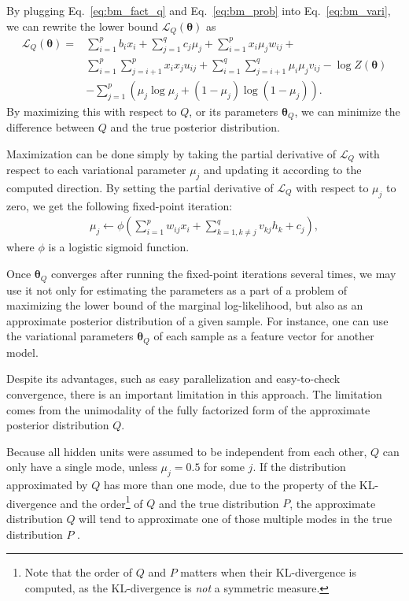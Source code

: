 \documentclass[dissertation,nocontribution,draft*]{aaltoseries}
\newcommand{\vects}[1]{\boldsymbol{#1}}
\newcommand{\TT}[0]{{\vects{\theta}}}
\newcommand{\LL}[0]{\mathcal{L}}
\begin{document}
By plugging Eq.~\eqref{eq:bm_fact_q} and
Eq.~\eqref{eq:bm_prob} into Eq.~\eqref{eq:bm_vari}, we can
rewrite the lower bound $\LL_Q(\TT)$ as
\begin{align}
    \label{eq:bm_lowerbound}
    \LL_Q(\TT) =& \sum_{i=1}^p b_i x_i + \sum_{j=1}^q c_j
    \mu_j + \sum_{i=1}^p x_i \mu_j w_{ij} + 
    \nonumber \\ 
    & \sum_{i=1}^p \sum_{j=i+1}^p x_i x_j u_{ij} +
    \sum_{i=1}^q \sum_{j=i+1}^q \mu_i \mu_j v_{ij} -\log
    Z(\TT) 
    \nonumber \\
    & - \sum_{j=1}^p \left( \mu_j \log \mu_j + (1
    - \mu_j) \log (1 - \mu_j)
    \right).
\end{align}
By maximizing this with respect to $Q$, or its
parameters $\TT_Q$, we can minimize the difference between
$Q$ and the true posterior distribution. 

Maximization can be done simply by taking the
partial derivative of $\LL_Q$ with respect to each variational
parameter $\mu_j$ and updating it according to the computed
direction. By setting the partial derivative of $\LL_Q$ with
respect to $\mu_j$ to zero, we get the following fixed-point
iteration:
\begin{align}
    \label{eq:vari_update}
    \mu_j \leftarrow \phi\left(\sum_{i=1}^p w_{ij} x_i +
    \sum_{k=1, k\neq j}^q v_{kj} h_k + c_j\right),
\end{align}
where $\phi$ is a logistic sigmoid function.

Once $\TT_Q$ converges after running the fixed-point
iterations several times, we may use it not only for
estimating the parameters as a part of a problem of
maximizing the lower bound of the marginal log-likelihood,
but also as an approximate posterior distribution of a given
sample. For instance, one can use the variational parameters
$\TT_Q$ of each sample as a feature vector for another
model.

Despite its advantages, such as easy parallelization and
easy-to-check convergence, there is an important limitation
in this approach. The limitation comes from the unimodality
of the fully factorized form of the approximate posterior
distribution $Q$.

Because all hidden units were assumed to be independent from
each other, $Q$ can only have a single mode, unless
$\mu_j=0.5$ for some $j$. If the distribution approximated
by $Q$ has more than one mode, due to the property of the
KL-divergence and the order\footnote{Note that the order of
$Q$ and $P$ matters when their KL-divergence is computed, as
the KL-divergence is \textit{not} a symmetric measure.} of
$Q$ and the true distribution $P$, the approximate
distribution $Q$ will tend to approximate one of those
multiple modes in the true distribution $P$
\citep[see][Section 21.2.2 for more details]{Murphy2012}.
\end{document}
